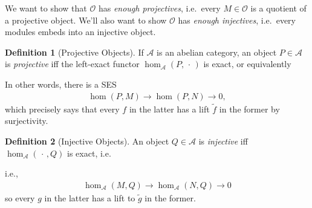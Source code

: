 \documentclass[11pt]{scrartcl}
\theoremstyle{definition}
\theoremstyle{theorem}
\theoremstyle{proof}
\theoremstyle{definition}
\newtheorem{definition}{Definition}[theorem]
\theoremstyle{break}
\theoremstyle{problem}
\newcommand{\OO}[0]{{\mathcal{O}}}
\newcommand{\mca}[0]{{\mathcal{A}}}
\newcommand{\wait}[0]{{\,\cdot\,}}
\renewcommand{\to}[0]{\longrightarrow}
\begin{document}
We want to show that \(\OO\) has \emph{enough projectives}, i.e.~every
\(M\in \OO\) is a quotient of a projective object. We'll also want to
show \(\OO\) has \emph{enough injectives}, i.e.~every modules embeds
into an injective object.

\begin{definition}[Projective Objects]

If \(\mca\) is an abelian category, an object \(P\in\mca\) is
\emph{projective} iff the left-exact functor \(\hom_\mca(P, \wait)\) is
exact, or equivalently

\begin{center}
\end{center}

In other words, there is a SES
\begin{align*}\hom(P, M) \to \hom(P, N) \to 0,\end{align*} which
precisely says that every \(f\) in the latter has a lift \(\tilde f\) in
the former by surjectivity.\end{definition}

\begin{definition}[Injective Objects]

An object \(Q\in\mca\) is \emph{injective} iff \(\hom_\mca(\wait, Q)\)
is exact, i.e.

\begin{center}
\end{center}

i.e.,
\begin{align*}\hom_\mca(M, Q) \to \hom_\mca(N, Q) \to 0\end{align*} so
every \(g\) in the latter has a lift to \(\tilde g\) in the
former.\end{definition}
\end{document}
